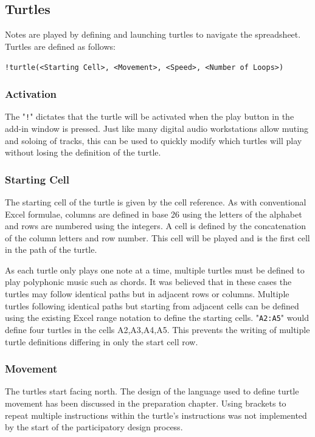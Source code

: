 \subsection{Turtles}

Notes are played by defining and launching turtles to navigate the spreadsheet. Turtles are defined as follows:

\texttt{!turtle(<Starting Cell>, <Movement>, <Speed>, <Number of Loops>)}

\subsubsection{Activation}

The "\texttt{!}" dictates that the turtle will be activated when the play button in the add-in window is pressed. Just like many digital audio workstations allow muting and soloing of tracks, this can be used to quickly modify which turtles will play without losing the definition of the turtle.

\subsubsection{Starting Cell}

The starting cell of the turtle is given by the cell reference. As with conventional Excel formulae, columns are defined in base 26 using the letters of the alphabet and rows are numbered using the integers. A cell is defined by the concatenation of the column letters and row number. This cell will be played and is the first cell in the path of the turtle.

As each turtle only plays one note at a time, multiple turtles must be defined to play polyphonic music such as chords. It was believed that in these cases the turtles may follow identical paths but in adjacent rows or columns. Multiple turtles following identical paths but starting from adjacent cells can be defined using the existing Excel range notation to define the starting cells. "\texttt{A2:A5}" would define four turtles in the cells A2,A3,A4,A5. This prevents the writing of multiple turtle definitions differing in only the start cell row.

\subsubsection{Movement}

The turtles start facing north. The design of the language used to define turtle movement has been discussed in the preparation chapter. Using brackets to repeat multiple instructions within the turtle's instructions was not implemented by the start of the participatory design process.

